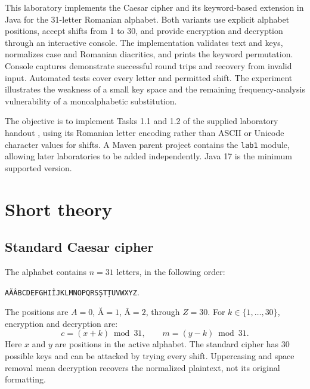 \documentclass{utmreport}
\begin{document}
\makeutmreporttitlepage
\tableofcontents
\clearpage
\begin{utmabstract}[Abstract]
This laboratory implements the Caesar cipher and its keyword-based extension in Java for the 31-letter Romanian alphabet. Both variants use explicit alphabet positions, accept shifts from 1 to 30, and provide encryption and decryption through an interactive console. The implementation validates text and keys, normalizes case and Romanian diacritics, and prints the keyword permutation. Console captures demonstrate successful round trips and recovery from invalid input. Automated tests cover every letter and permitted shift. The experiment illustrates the weakness of a small key space and the remaining frequency-analysis vulnerability of a monoalphabetic substitution.
\end{utmabstract}
\utmintroduction
The objective is to implement Tasks 1.1 and 1.2 of the supplied laboratory handout \cite{handout}, using its Romanian letter encoding rather than ASCII or Unicode character values for shifts. A Maven parent project contains the \texttt{lab1} module, allowing later laboratories to be added independently. Java 17 is the minimum supported version.

\chapter{Short theory}
\section{Standard Caesar cipher}
The alphabet contains $n=31$ letters, in the following order:
\begin{center}
\texttt{AĂÂBCDEFGHIÎJKLMNOPQRSȘTȚUVWXYZ}.
\end{center}
The positions are $A=0$, $\text{Ă}=1$, $\text{Â}=2$, through $Z=30$. For $k\in\{1,\ldots,30\}$, encryption and decryption are:
\begin{equation} c=(x+k)\bmod31,\qquad m=(y-k)\bmod31.\end{equation}
Here $x$ and $y$ are positions in the active alphabet. The standard cipher has 30 possible keys and can be attacked by trying every shift. Uppercasing and space removal mean decryption recovers the normalized plaintext, not its original formatting.
\end{document}
